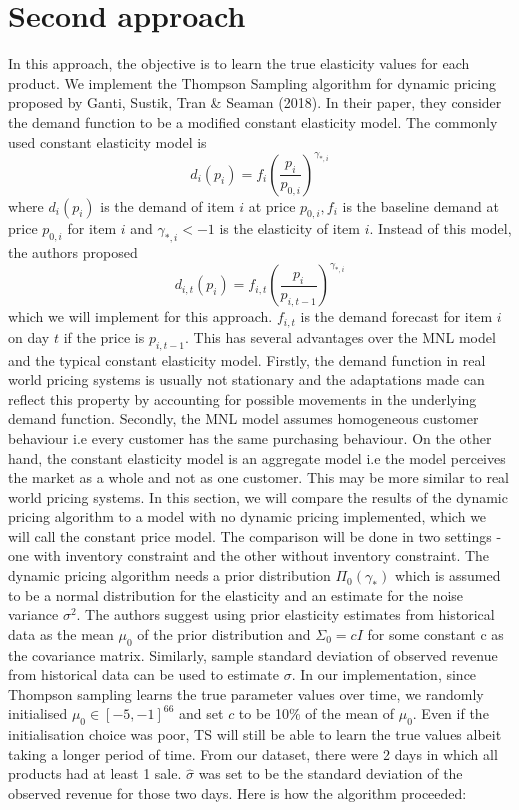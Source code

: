 \documentclass[a4paper]{article}
\begin{document}
\section{Second approach}
In this approach, the objective is to learn the true elasticity values for each product. We implement the Thompson Sampling algorithm for dynamic pricing proposed by Ganti, Sustik, Tran \& Seaman (2018). In their paper, they consider the demand function to be a modified constant elasticity model. The commonly used constant elasticity model is 
\[d_i(p_i) = f_i \left(\frac{p_i}{p_{0,i}}\right)^{\gamma_{*,i}} \]
where $d_i(p_i)$ is the demand of item $i$ at price $p_{0,i}, f_i$ is the baseline demand at price $p_{0,i}$ for item $i$ and $\gamma_{*,i} < -1$ is the elasticity of item $i$. Instead of this model, the authors proposed 
\[d_{i,t}(p_i) = f_{i,t} \left(\frac{p_i}{p_{i,t-1}}\right)^{\gamma_{*,i}} \]
which we will implement for this approach. $f_{i,t}$ is the demand forecast for item $i$ on day $t$ if the price is $p_{i,t-1}$. This has several advantages over the MNL model and the typical constant elasticity model. Firstly, the demand function in real world pricing systems is usually not stationary and the adaptations made can reflect this property by accounting for possible movements in the underlying demand function. Secondly, the MNL model assumes homogeneous customer behaviour i.e every customer has the same purchasing behaviour. On the other hand, the constant elasticity model is an aggregate model i.e the model perceives the market as a whole and not as one customer. This may be more similar to real world pricing systems.
\newline
\newline
In this section, we will compare the results of the dynamic pricing algorithm to a model with no dynamic pricing implemented, which we will call the constant price model. The comparison will be done in two settings - one with inventory constraint and the other without inventory constraint.
\newline
\newline
The dynamic pricing algorithm needs a prior distribution $\Pi_0(\gamma_*)$ which is assumed to be a normal distribution for the elasticity and an estimate for the noise variance $\sigma^2$. The authors suggest using prior elasticity estimates from historical data as the mean $\mu_0$ of the prior distribution and $\Sigma_0 = cI$ for some constant c as the covariance matrix. Similarly, sample standard deviation of observed revenue from historical data can be used to estimate $\sigma$. In our implementation, since Thompson sampling learns the true parameter values over time, we randomly initialised $\mu_0 \in [-5, -1]^{66}$ and set $c$ to be 10\% of the mean of $\mu_0$. Even if the initialisation choice was poor, TS will still be able to learn the true values albeit taking a longer period of time. From our dataset, there were 2 days in which all products had at least 1 sale. $\hat{\sigma}$ was set to be the standard deviation of the observed revenue for those two days. Here is how the algorithm proceeded:
\end{document}
